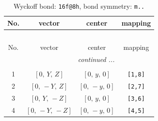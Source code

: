 \documentclass[fleqn,8pt]{jsarticle}
\begin{document}
\renewcommand{\arraystretch}{1.2}
\begin{longtable}{cccc}
\caption{Wyckoff bond: {\tt 16f@8h}, bond symmetry: {\tt m..}}
 \\
 \hline \hline
No. & vector & center & mapping \\ \hline \endfirsthead

\multicolumn{3}{l}{\tablename\ \thetable{}} \\
 \hline \hline
No. & vector & center & mapping \\ \hline \endhead

 \hline \hline
\multicolumn{3}{r}{\footnotesize\it continued ...} \\ \endfoot

 \hline \hline
\multicolumn{3}{r}{} \\ \endlastfoot

1 & $\left[ 0,\, Y,\, Z \right]$ & $\left[ 0,\, y,\, 0 \right]$ & {\tt [1,8]} \\ \hline
2 & $\left[ 0,\, - Y,\, Z \right]$ & $\left[ 0,\, - y,\, 0 \right]$ & {\tt [2,7]} \\ \hline
3 & $\left[ 0,\, Y,\, - Z \right]$ & $\left[ 0,\, y,\, 0 \right]$ & {\tt [3,6]} \\ \hline
4 & $\left[ 0,\, - Y,\, - Z \right]$ & $\left[ 0,\, - y,\, 0 \right]$ & {\tt [4,5]} \\
\end{longtable}
\renewcommand{\arraystretch}{1.2}
\end{document}
